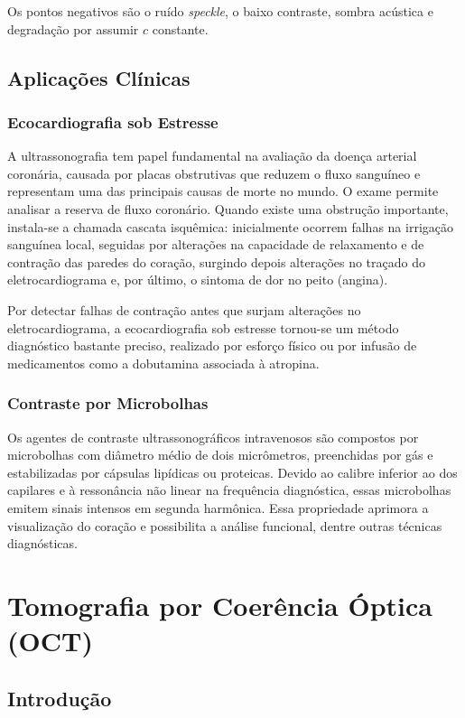 \documentclass[a4paper,12pt,oneside,openright]{abntex2}
\begin{document}
Os pontos negativos são o ruído \textit{speckle}, o baixo contraste, sombra acústica e degradação por assumir $c$ constante.

\section{Aplicações Clínicas}
\subsection{Ecocardiografia sob Estresse}

A ultrassonografia tem papel fundamental na avaliação da doença arterial coronária, causada por placas obstrutivas que reduzem o fluxo sanguíneo e representam uma das principais causas de morte no mundo. O exame permite analisar a reserva de fluxo coronário. Quando existe uma obstrução importante, instala-se a chamada cascata isquêmica: inicialmente ocorrem falhas na irrigação sanguínea local, seguidas por alterações na capacidade de relaxamento e de contração das paredes do coração, surgindo depois alterações no traçado do eletrocardiograma e, por último, o sintoma de dor no peito (angina).

Por detectar falhas de contração antes que surjam alterações no eletrocardiograma, a ecocardiografia sob estresse tornou-se um método diagnóstico bastante preciso, realizado por esforço físico ou por infusão de medicamentos como a dobutamina associada à atropina. 

\subsection{Contraste por Microbolhas}

Os agentes de contraste ultrassonográficos intravenosos são compostos por microbolhas com diâmetro médio de dois micrômetros, preenchidas por gás e estabilizadas por cápsulas lipídicas ou proteicas. Devido ao calibre inferior ao dos capilares e à ressonância não linear na frequência diagnóstica, essas microbolhas emitem sinais intensos em segunda harmônica. Essa propriedade aprimora a visualização do coração e possibilita a análise funcional, dentre outras técnicas diagnósticas.

\chapter{Tomografia por Coerência Óptica (OCT)}

\section{Introdução}
\end{document}

